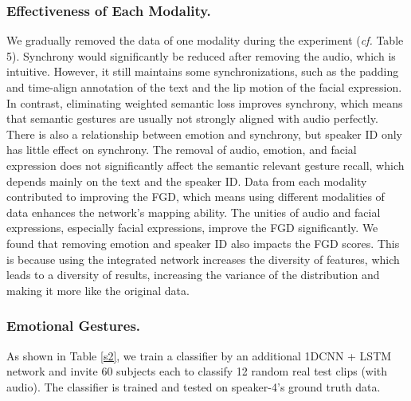 \documentclass[runningheads]{llncs}
\begin{document}
\subsubsection{Effectiveness of Each Modality.} We gradually removed the data of one modality during the experiment (\textit{cf.} Table 5). Synchrony would significantly be reduced after removing the audio, which is intuitive. However, it still maintains some synchronizations, such as the padding and time-align annotation of the text and the lip motion of the facial expression. In contrast, eliminating weighted semantic loss improves synchrony, which means that semantic gestures are usually not strongly aligned with audio perfectly. There is also a relationship between emotion and synchrony, but speaker ID only has little effect on synchrony. The removal of audio, emotion, and facial expression does not significantly affect the semantic relevant gesture recall, which depends mainly on the text and the speaker ID. Data from each modality contributed to improving the FGD, which means using different modalities of data enhances the network's mapping ability. The unities of audio and facial expressions, especially facial expressions, improve the FGD significantly. We found that removing emotion and speaker ID also impacts the FGD scores. This is because using the integrated network increases the diversity of features, which leads to a diversity of results, increasing the variance of the distribution and making it more like the original data.

\subsubsection{Emotional Gestures.} As shown in Table \ref{s2}, we train a classifier by an additional 1DCNN + LSTM network and invite 60 subjects each to classify 12 random real test clips (with audio). The classifier is trained and tested on speaker-4's ground truth data.

\begin{table}[h]
\caption{\textbf{Emotional Gesture Classification.} The classification accuracy (\%) gap between the test real and generated data (1344 clips, 10s each) is 15.85.}
\centering
\label{s2}
\end{table}
\vspace{-0.5cm}
\end{document}
